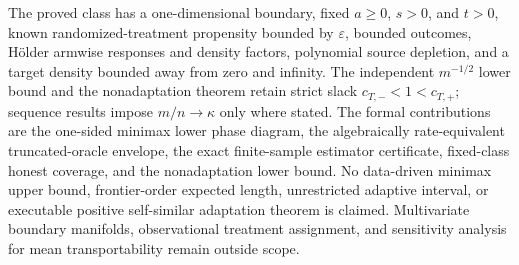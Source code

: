 The proved class has a one-dimensional boundary, fixed \(a\ge0\), \(s>0\), and \(t>0\), known randomized-treatment propensity bounded by \(\varepsilon\), bounded outcomes, Hölder armwise responses and density factors, polynomial source depletion, and a target density bounded away from zero and infinity. The independent \(m^{-1/2}\) lower bound and the nonadaptation theorem retain strict slack \(c_{T,-}<1<c_{T,+}\); sequence results impose \(m/n\to\kappa\) only where stated. The formal contributions are the one-sided minimax lower phase diagram, the algebraically rate-equivalent truncated-oracle envelope, the exact finite-sample estimator certificate, fixed-class honest coverage, and the nonadaptation lower bound. No data-driven minimax upper bound, frontier-order expected length, unrestricted adaptive interval, or executable positive self-similar adaptation theorem is claimed. Multivariate boundary manifolds, observational treatment assignment, and sensitivity analysis for mean transportability remain outside scope.